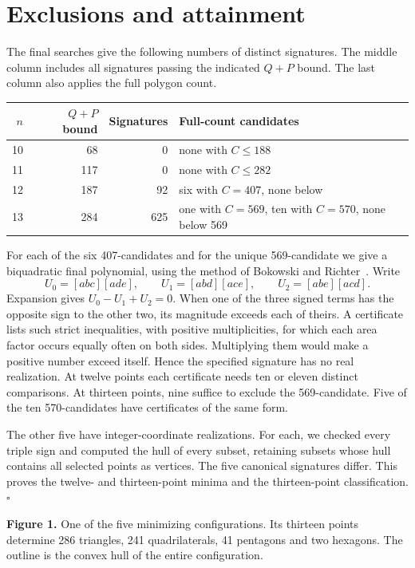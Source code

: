 \documentclass[11pt]{article}
\begin{document}
\section{Exclusions and attainment}
The final searches give the following numbers of distinct signatures. The middle column includes all signatures passing the indicated $Q+P$ bound. The last column also applies the full polygon count.
\begin{center}
\begin{tabular}{r r r l}\toprule
$n$ & $Q+P$ bound & Signatures & Full-count candidates\\\midrule
10 & 68 & 0 & none with $C\le188$\\
11 & 117 & 0 & none with $C\le282$\\
12 & 187 & 92 & six with $C=407$, none below\\
13 & 284 & 625 & one with $C=569$, ten with $C=570$, none below 569\\\bottomrule
\end{tabular}
\end{center}
For each of the six 407-candidates and for the unique 569-candidate we give a biquadratic final polynomial, using the method of Bokowski and Richter~\cite{br}. Write
\[
 U_0=[abc][ade],\qquad U_1=[abd][ace],\qquad U_2=[abe][acd].
\]
Expansion gives $U_0-U_1+U_2=0$. When one of the three signed terms has the opposite sign to the other two, its magnitude exceeds each of theirs. A certificate lists such strict inequalities, with positive multiplicities, for which each area factor occurs equally often on both sides. Multiplying them would make a positive number exceed itself. Hence the specified signature has no real realization. At twelve points each certificate needs ten or eleven distinct comparisons. At thirteen points, nine suffice to exclude the 569-candidate. Five of the ten 570-candidates have certificates of the same form.

The other five have integer-coordinate realizations. For each, we checked every triple sign and computed the hull of every subset, retaining subsets whose hull contains all selected points as vertices. The five canonical signatures differ. This proves the twelve- and thirteen-point minima and the thirteen-point classification. \hfill$\square$

\begin{center}
\begin{minipage}{0.29\linewidth}\centering
{}
\end{minipage}\hfill
\begin{minipage}{0.65\linewidth}\small
\textbf{Figure 1.} One of the five minimizing configurations. Its thirteen points determine 286 triangles, 241 quadrilaterals, 41 pentagons and two hexagons. The outline is the convex hull of the entire configuration.
\end{minipage}
\end{center}
\end{document}
